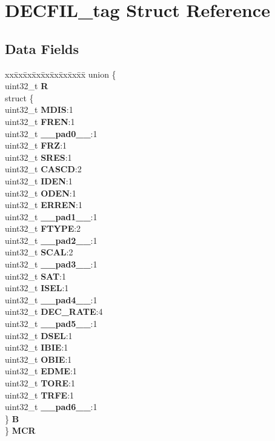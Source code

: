 \hypertarget{structDECFIL__tag}{}\section{D\+E\+C\+F\+I\+L\+\_\+tag Struct Reference}
\label{structDECFIL__tag}
\subsection*{Data Fields}
\begin{DoxyCompactItemize}
\item 
\mbox{\label{structDECFIL__tag_a15923353bb1f184db1d4c7ee5fcf2fcb}} 
\begin{tabbing}
xx\=xx\=xx\=xx\=xx\=xx\=xx\=xx\=xx\=\kill
union \{\\
\>uint32\_t {\bfseries R}\\
\>struct \{\\
\>\>uint32\_t {\bfseries MDIS}:1\\
\>\>uint32\_t {\bfseries FREN}:1\\
\>\>uint32\_t {\bfseries \_\_pad0\_\_}:1\\
\>\>uint32\_t {\bfseries FRZ}:1\\
\>\>uint32\_t {\bfseries SRES}:1\\
\>\>uint32\_t {\bfseries CASCD}:2\\
\>\>uint32\_t {\bfseries IDEN}:1\\
\>\>uint32\_t {\bfseries ODEN}:1\\
\>\>uint32\_t {\bfseries ERREN}:1\\
\>\>uint32\_t {\bfseries \_\_pad1\_\_}:1\\
\>\>uint32\_t {\bfseries FTYPE}:2\\
\>\>uint32\_t {\bfseries \_\_pad2\_\_}:1\\
\>\>uint32\_t {\bfseries SCAL}:2\\
\>\>uint32\_t {\bfseries \_\_pad3\_\_}:1\\
\>\>uint32\_t {\bfseries SAT}:1\\
\>\>uint32\_t {\bfseries ISEL}:1\\
\>\>uint32\_t {\bfseries \_\_pad4\_\_}:1\\
\>\>uint32\_t {\bfseries DEC\_RATE}:4\\
\>\>uint32\_t {\bfseries \_\_pad5\_\_}:1\\
\>\>uint32\_t {\bfseries DSEL}:1\\
\>\>uint32\_t {\bfseries IBIE}:1\\
\>\>uint32\_t {\bfseries OBIE}:1\\
\>\>uint32\_t {\bfseries EDME}:1\\
\>\>uint32\_t {\bfseries TORE}:1\\
\>\>uint32\_t {\bfseries TRFE}:1\\
\>\>uint32\_t {\bfseries \_\_pad6\_\_}:1\\
\>\} {\bfseries B}\\
\} {\bfseries MCR}\\


\end{tabbing}
\end{DoxyCompactItemize}
